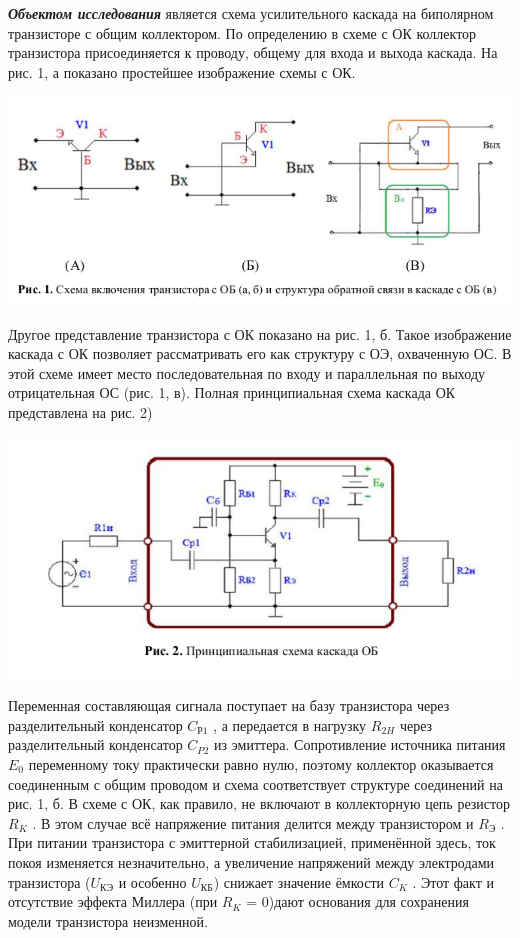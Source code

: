 \documentclass[a4paper,14pt]{extarticle}
\begin{document}
    \textbf{\emph{Объектом исследования}} является схема усилительного каскада на
    биполярном транзисторе с общим коллектором. По определению в схеме с ОК
    коллектор транзистора присоединяется к проводу, общему для входа и выхода
    каскада. На рис. 1, а показано простейшее изображение схемы с ОК.
    
    \begin{center}
        \includegraphics[scale=0.85]{0.1.png}
    \end{center}

    Другое представление транзистора с ОК показано на рис. 1, б. Такое
    изображение каскада с ОК позволяет рассматривать его как структуру с ОЭ,
    охваченную ОС. В этой схеме имеет место последовательная по входу и
    параллельная по выходу отрицательная ОС (рис. 1, в). Полная принципиальная
    схема каскада ОК представлена на рис. 2)

    \begin{center}
        \includegraphics[scale=0.85]{0.2.png}
    \end{center}

    Переменная составляющая сигнала поступает на базу транзистора через
    разделительный конденсатор $C_{\text{Р1}}$ , а передается в нагрузку $R_{2H}$ через
    разделительный конденсатор $C_{P2}$ из эмиттера. Сопротивление источника
    питания $E_0$ переменному току практически равно нулю, поэтому коллектор
    оказывается соединенным с общим проводом и схема соответствует структуре
    соединений на рис. 1, б. В схеме с ОК, как правило, не включают в
    коллекторную цепь резистор $R_K$ . В этом случае всё напряжение питания
    делится между транзистором и $R_{\text{Э}}$ . При питании транзистора с эмиттерной
    стабилизацией, применённой здесь, ток покоя изменяется незначительно, а
    увеличение напряжений между электродами транзистора ($U_{\text{КЭ}}$ и особенно $U_{\text{КБ}}$)
    снижает значение ёмкости $C_K$ . Этот факт и отсутствие эффекта Миллера (при
    $R_K$ = 0)дают основания для сохранения модели транзистора неизменной.
\end{document}
